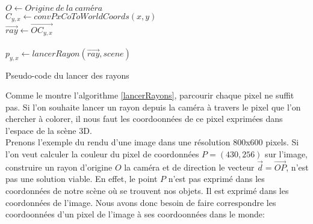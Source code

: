 \documentclass[11pt]{article}
\begin{document}
\begin {algorithm}
	\DontPrintSemicolon

	$O \gets Origine\ de\ la\ caméra$\\
	{
		{
			$C_{y, x} \gets convPxCoToWorldCoords(x, y)$\\
			$\overrightarrow{ray} \gets \overrightarrow{OC_{y,x}}$\\
			\hfill\\
			$p_{y, x} \gets lancerRayon(\overrightarrow{ray}, scene)$
		}
	}

	\caption{Pseudo-code du lancer des rayons}
	\label{lancerRayons}
\end {algorithm}

Comme le montre l'algorithme \ref{lancerRayons}, parcourir chaque pixel ne suffit pas. Si l'on souhaite lancer un rayon depuis la caméra à travers le pixel que l'on chercher à colorer, il nous faut les coordoonnées de ce pixel exprimées dans l'espace de la scène 3D.\\
Prenons l'exemple du rendu d'une image dans une résolution 800x600 pixels. Si l'on veut calculer la couleur du pixel de coordonnées $P = (430, 256)$ sur l'image, construire un rayon d'origine $O$ la caméra et de direction le vecteur $\overrightarrow{d} = \overrightarrow{OP}$, n'est pas une solution viable. En effet, le point $P$ n'est pas exprimé dans les coordonnées de notre scène où se trouvent nos objets. Il est exprimé dans les coordonnées de l'image. Nous avons donc besoin de faire correspondre les coordoonnées d'un pixel de l'image à ses coordoonnées dans le monde:
\end{document}
